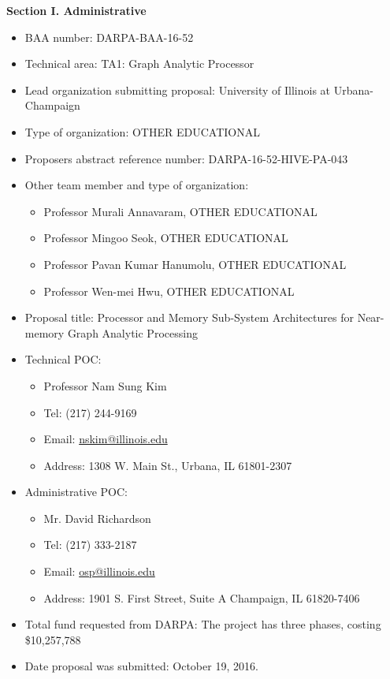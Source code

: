 \documentclass[12pt]{article}
\makeatletter
\renewcommand\section{\@startsection {section}{1}{\z@}%
   {-3ex \@plus -1ex \@minus -.2ex}%
   {1.7ex \@plus.2ex}%
   {\normalfont\large\bfseries}}
\makeatother
\begin{document}
\thispagestyle{empty}

\begin{comment}
\vspace{-0.2in}
\section{Statement of Work}

\newpage
\end{comment}

\noindent 
{\large \bfseries Section I. Administrative}

\begin{itemize}
\item BAA number: DARPA-BAA-16-52
\item Technical area: TA1: Graph Analytic Processor
\item Lead organization submitting proposal: University of Illinois at Urbana-Champaign
\item Type of organization: OTHER EDUCATIONAL
\item Proposers abstract reference number: DARPA-16-52-HIVE-PA-043
\item Other team member and type of organization: 
\begin{itemize}
\item Professor Murali Annavaram, OTHER EDUCATIONAL
\item Professor Mingoo Seok, OTHER EDUCATIONAL
\item Professor Pavan Kumar Hanumolu, OTHER EDUCATIONAL
\item Professor Wen-mei Hwu, OTHER EDUCATIONAL
\end{itemize}
\item Proposal title: Processor and Memory Sub-System Architectures for Near-memory Graph Analytic Processing
\item Technical POC: 
\begin{itemize}
\item Professor Nam Sung Kim
\item Tel: (217) 244-9169
\item Email: \url{nskim@illinois.edu}
\item Address: 1308 W. Main St., Urbana, IL 61801-2307
\end{itemize}
\item Administrative POC: 
\begin{itemize}
\item Mr. David Richardson
\item Tel: (217) 333-2187
\item Email: \url{osp@illinois.edu}
\item Address: 1901 S. First Street, Suite A Champaign, IL 61820-7406
\end{itemize}
\item Total fund requested from DARPA: The project has three phases, costing \$10,257,788 
\item Date proposal was submitted: October 19, 2016.
\end{itemize}
\end{document}
